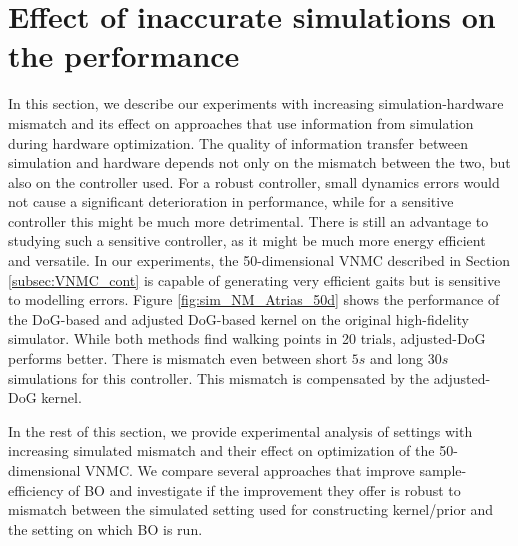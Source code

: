 

\section{Effect of inaccurate simulations on the performance}

\label{subsec:mismatch_experiments}


In this section, we describe our experiments with increasing simulation-hardware mismatch and its effect on approaches that use information from simulation during hardware optimization. The quality of information transfer between simulation and hardware depends not only on the mismatch between the two, but also on the controller used. For a robust controller, small dynamics errors would not cause a significant deterioration in performance, while for a sensitive controller this might be much more detrimental. There is still an advantage to studying such a sensitive controller, as it might be much more energy efficient and versatile. In our experiments, the 50-dimensional VNMC described in Section \ref{subsec:VNMC_cont} is capable of generating very efficient gaits but is sensitive to modelling errors. Figure \ref{fig:sim_NM_Atrias_50d} shows the performance of the DoG-based and adjusted DoG-based kernel on the original high-fidelity simulator. While both methods find walking points in 20 trials, adjusted-DoG performs better. There is mismatch even between short $5s$ and long $30s$ simulations for this controller. This mismatch is compensated by the adjusted-DoG kernel.


In the rest of this section, we provide experimental analysis of settings with increasing simulated mismatch and their effect on optimization of the 50-dimensional VNMC. We compare several approaches that improve sample-efficiency of BO and investigate if the improvement they offer is robust to mismatch between the simulated setting used for constructing kernel/prior and the setting on which BO is run. 

